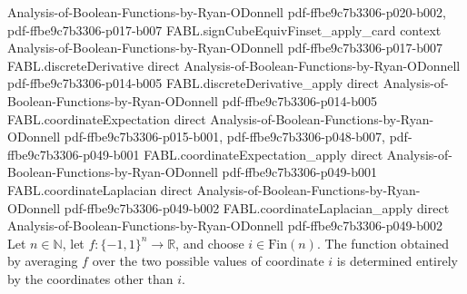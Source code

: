 \begin{theorem}
  {Analysis-of-Boolean-Functions-by-Ryan-ODonnell}
  {pdf-ffbe9c7b3306-p020-b002,
    pdf-ffbe9c7b3306-p017-b007}
\proofstep
  {FABL.signCubeEquivFinset_apply_card}
  {context}
  {Analysis-of-Boolean-Functions-by-Ryan-ODonnell}
  {pdf-ffbe9c7b3306-p017-b007}
\proofstep
  {FABL.discreteDerivative}
  {direct}
  {Analysis-of-Boolean-Functions-by-Ryan-ODonnell}
  {pdf-ffbe9c7b3306-p014-b005}
\proofstep
  {FABL.discreteDerivative_apply}
  {direct}
  {Analysis-of-Boolean-Functions-by-Ryan-ODonnell}
  {pdf-ffbe9c7b3306-p014-b005}
\proofstep
  {FABL.coordinateExpectation}
  {direct}
  {Analysis-of-Boolean-Functions-by-Ryan-ODonnell}
  {pdf-ffbe9c7b3306-p015-b001,
    pdf-ffbe9c7b3306-p048-b007,
    pdf-ffbe9c7b3306-p049-b001}
\proofstep
  {FABL.coordinateExpectation_apply}
  {direct}
  {Analysis-of-Boolean-Functions-by-Ryan-ODonnell}
  {pdf-ffbe9c7b3306-p049-b001}
\proofstep
  {FABL.coordinateLaplacian}
  {direct}
  {Analysis-of-Boolean-Functions-by-Ryan-ODonnell}
  {pdf-ffbe9c7b3306-p049-b002}
\proofstep
  {FABL.coordinateLaplacian_apply}
  {direct}
  {Analysis-of-Boolean-Functions-by-Ryan-ODonnell}
  {pdf-ffbe9c7b3306-p049-b002}
Let $n\in\mathbb N$, let $f:\{−1,1\}^n\to\mathbb R$, and choose $i\in\mathrm{Fin}(n)$.
The function obtained by averaging $f$ over the two possible values of coordinate $i$ is
determined entirely by the coordinates other than $i$.
\end{theorem}

